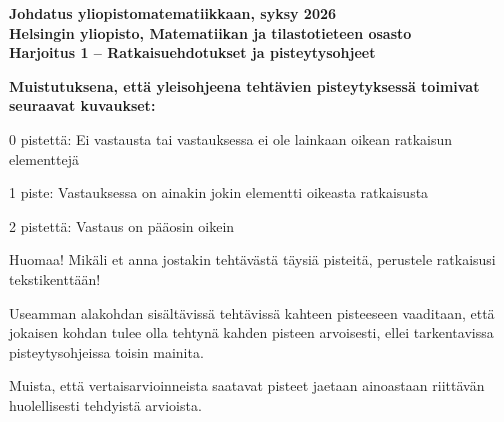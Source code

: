 \documentclass[11pt,a4paper,oneside,notitlepage,final]{article}
\newcommand{\kor}[1]{\textbf{#1}}
\begin{document}
\setlength{\abovedisplayskip}{8.0pt plus3.0pt minus4.0pt}
\setlength{\abovedisplayshortskip}{0.0pt plus3.0pt}
\setlength{\belowdisplayskip}{8.0pt plus3.0pt minus4.0pt}
\setlength{\belowdisplayshortskip}{7.0pt plus3.0pt minus3.0pt}

{
\kor{Johdatus yliopistomatematiikkaan, syksy 2026\\
Helsingin yliopisto, Matematiikan ja tilastotieteen osasto \\
Harjoitus 1 -- Ratkaisuehdotukset ja pisteytysohjeet}\\
%
}

{\bf Muistutuksena, että yleisohjeena tehtävien pisteytyksessä toimivat seuraavat kuvaukset:

0 pistettä: Ei vastausta tai vastauksessa ei ole lainkaan oikean ratkaisun elementtejä

1 piste: Vastauksessa on ainakin jokin elementti oikeasta ratkaisusta

2 pistettä: Vastaus on pääosin oikein

Huomaa! Mikäli et anna jostakin tehtävästä täysiä pisteitä, perustele ratkaisusi tekstikenttään!

Useamman alakohdan sisältävissä tehtävissä kahteen pisteeseen vaaditaan, että jokaisen kohdan tulee olla tehtynä kahden pisteen arvoisesti, ellei tarkentavissa pisteytysohjeissa toisin mainita.

Muista, että vertaisarvioinneista saatavat pisteet jaetaan ainoastaan riittävän huolellisesti tehdyistä arvioista.}
\end{document}
